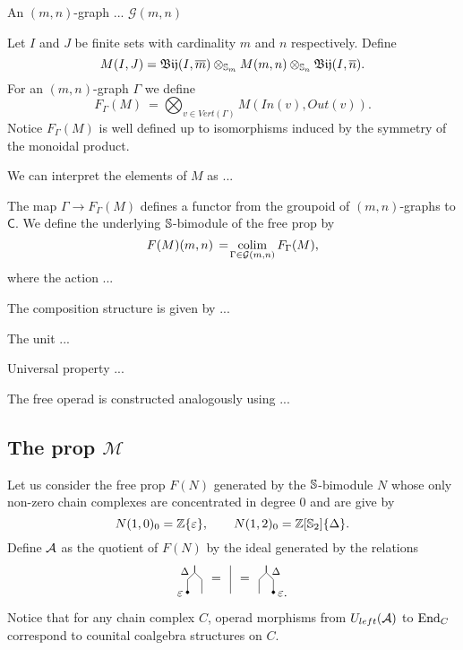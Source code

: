 An $(m, n)$-graph ... $\mathcal G(m, n)$

Let $I$ and $J$ be finite sets with cardinality $m$ and $n$ respectively.
Define
\begin{equation*}
M(I, J) = \Bij(I, \overline m) \otimes_{\S_m} M(m, n) \otimes_{\S_n} \Bij(I, \overline n).
\end{equation*}
For an $(m, n)$-graph $\Gamma$ we define
\begin{equation*}
F_\Gamma(M)\ =\!\!\! \bigotimes_{v \in Vert(\Gamma)}M(In(v), Out(v)).
\end{equation*}
Notice $F_\Gamma(M)$ is well defined up to isomorphisms induced by the symmetry of the monoidal product.

We can interpret the elements of $M$ as ...

The map $\Gamma \to F_\Gamma(M)$ defines a functor from the groupoid of $(m,n)$-graphs to $\mathsf C$. We define the underlying $\S$-bimodule of the free prop by
\begin{equation*}
F(M)(m, n)\, =\! \colim_{\Gamma \in \mathcal G(m, n)} F_\Gamma(M),
\end{equation*}
where the action ...

The composition structure is given by ...

The unit ...

Universal property ...

The free operad is constructed analogously using ...

\subsection{The prop $\mathcal M$}


Let us consider the free prop $F(N)$ generated by the $\S$-bimodule $N$ whose only non-zero chain complexes are concentrated in degree $0$ and are give by
\begin{equation*}
N(1, 0)_0 = \Z\{\varepsilon\}, \qquad
N(1, 2)_0 = \Z[\S_2]\{\Delta\}.
\end{equation*}
Define $\A$ as the quotient of $F(N)$ by the ideal generated by the relations
\begin{equation*}
\begin{tikzpicture}[scale=.2]
\draw (-4,0)--(-4,2)--(-5,3)--(-5,4);
\draw (-6,0)--(-6,2)--(-5,3)--(-5,4);
\node [left, scale=.8] at (-5.3,3.2) {$\Delta$};
\draw [fill] (-6,.2) circle [radius=.2];
\node [left] at (-6,0) {$\varepsilon$};

\node at (-2,2) {=};
\draw (0,0)--(0,4);
\node at (2,2) {=};

\draw (4,0)--(4,2)--(5,3)--(5,4);
\draw (6,0)--(6,2)--(5,3)--(5,4);
\node [right, scale=.8] at (5.3,3.2) {$\Delta$};
\draw [fill] (6,.2) circle [radius=.2];
\node [right] at (6,0) {$\varepsilon$.};
\end{tikzpicture}
\end{equation*}
Notice that for any chain complex $C$, operad morphisms from $\Uleft(\A)$ to $\End_C$ correspond to counital coalgebra structures on $C$.

